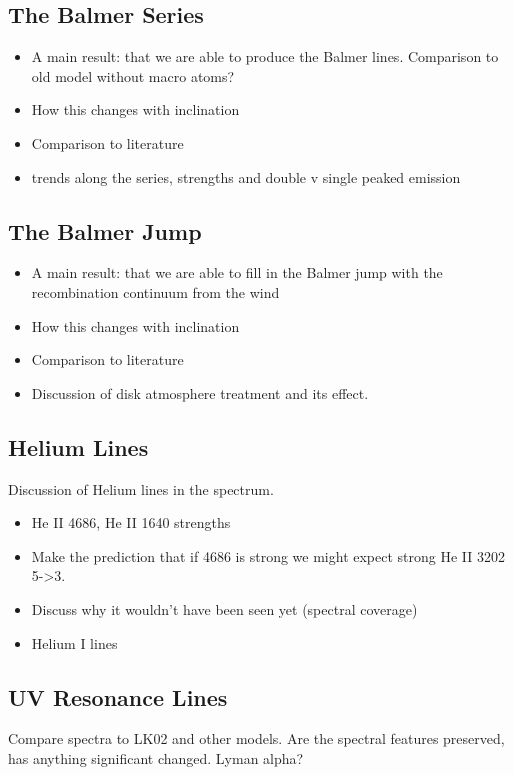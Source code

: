 \documentclass[preprint, a4paper, 11pt]{aastex}
\begin{document}
\subsection{The Balmer Series}
\begin{itemize}
\item A main result: that we are able to produce the Balmer lines. Comparison to old model without macro atoms?
\item How this changes with inclination
\item Comparison to literature
\item trends along the series, strengths and double v single peaked emission
\end{itemize}



\subsection{The Balmer Jump}
\label{balmerjump}
\begin{itemize}
\item A main result: that we are able to fill in the Balmer jump with the recombination continuum from the wind
\item How this changes with inclination
\item Comparison to literature
\item Discussion of disk atmosphere treatment and its effect.
\end{itemize}




\subsection{Helium Lines}
Discussion of Helium lines in the spectrum.
\begin{itemize}
\item He II 4686, He II 1640 strengths
\item Make the prediction that if 4686 is strong we might expect strong He II 3202 5->3. 
\item Discuss why it wouldn't have been seen yet (spectral coverage)
\item Helium I lines
\end{itemize}



\subsection{UV Resonance Lines}
Compare spectra to LK02 and other models. Are the spectral features preserved, has anything significant changed.
Lyman alpha?
\end{document}

